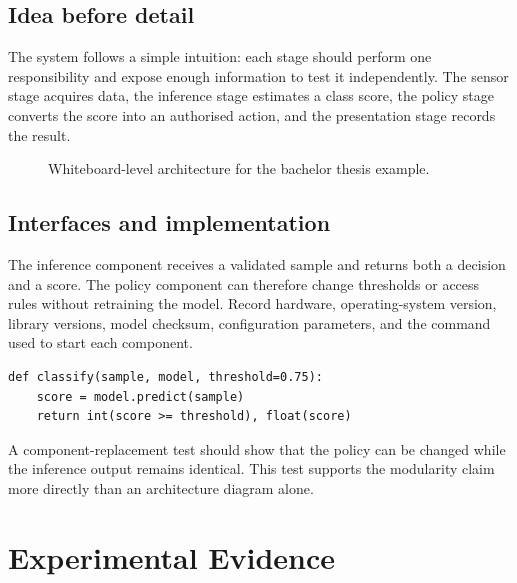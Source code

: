 \section{Idea before detail}
The system follows a simple intuition: each stage should perform one responsibility and expose enough information to test it independently. The sensor stage acquires data, the inference stage estimates a class score, the policy stage converts the score into an authorised action, and the presentation stage records the result.

\begin{figure}[htbp]
\centering
{}\pipelinearrow
{}\pipelinearrow
{}\pipelinearrow
{}
\caption{Whiteboard-level architecture for the bachelor thesis example.}
\label{fig:b-architecture}
\end{figure}

\section{Interfaces and implementation}
The inference component receives a validated sample and returns both a decision and a score. The policy component can therefore change thresholds or access rules without retraining the model. Record hardware, operating-system version, library versions, model checksum, configuration parameters, and the command used to start each component.

\begin{verbatim}
def classify(sample, model, threshold=0.75):
    score = model.predict(sample)
    return int(score >= threshold), float(score)
\end{verbatim}

\begin{resultbox}
A component-replacement test should show that the policy can be changed while the inference output remains identical. This test supports the modularity claim more directly than an architecture diagram alone.
\end{resultbox}

\chapter{Experimental Evidence}\label{ch:b-evaluation}
